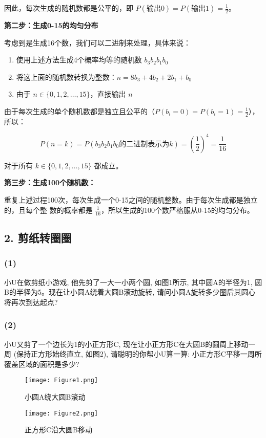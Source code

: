 \documentclass[UTF8]{ctexart}
\begin{document}
因此，每次生成的随机数都是公平的，即 $P(\text{输出0}) = P(\text{输出1}) =
\frac{1}{2}$。

\textbf{第二步：生成0-15的均匀分布}

考虑到是生成16个数，我们可以二进制来处理，具体来说：
\begin{enumerate}
    \item 使用上述方法生成4个概率均等的随机数 $b_3b_2b_1b_0$
    \item 将这上面的随机数转换为整数：$n = 8b_3 + 4b_2 + 2b_1 + b_0$
    \item 由于 $n \in \{0,1,2,\ldots,15\}$，直接输出 $n$
\end{enumerate}


由于每次生成的单个随机数都是独立且公平的（$P(b_i = 0) = P(b_i = 1) = \frac{1}{2}$），所以：

$$P(n = k) = P(b_3b_2b_1b_0 \text{的二进制表示为} k) = \left(\frac{1}{2}\right)^4 =
\frac{1}{16}$$

对于所有 $k \in \{0,1,2,\ldots,15\}$ 都成立。

\textbf{第三步：生成100个随机数：}

重复上述过程100次，每次生成一个0-15之间的随机整数。由于每次生成都是独立的，且每个整
数的概率都是 $\frac{1}{16}$，所以生成的100个数严格服从0-15的均匀分布。

\subsection*{2. 剪纸转圈圈}
\subsubsection*{(1)}
小U在做剪纸小游戏, 他先剪了一大一小两个圆, 如图1所示, 其中圆A的半径为1, 圆B的半径为5。现在让小圆A绕着大圆B滚动旋转, 请问小圆A旋转多少圈后其圆心将再次到达起点?

\subsubsection*{(2)}
小U又剪了一个边长为1的小正方形C, 现在让小正方形C在大圆B的圆周上移动一周 (保持正方形始终直立, 如图2), 请聪明的你帮小U算一算: 小正方形C平移一周所覆盖区域的面积是多少?

\begin{figure}[h!]
    \centering
    \begin{minipage}{0.45\textwidth}
        \centering
        \texttt{[image: Figure1.png]} 
        \caption{小圆A绕大圆B滚动}
        \label{fig:fig1}
    \end{minipage}\hfill
    \begin{minipage}{0.45\textwidth}
        \centering
        \texttt{[image: Figure2.png]}
        \caption{正方形C沿大圆B移动}
        \label{fig:fig2}
    \end{minipage}
\end{figure}
\end{document}
